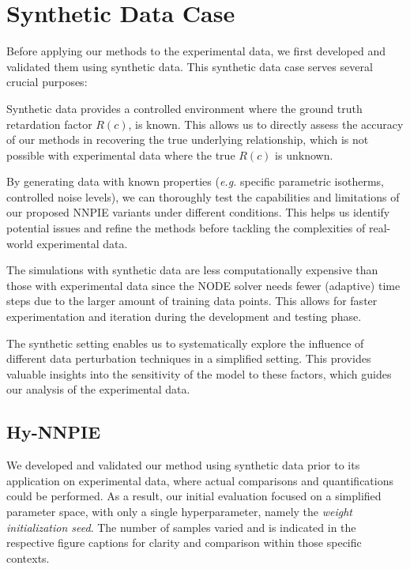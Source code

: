\section{Synthetic Data Case}
Before applying our methods to the experimental data, we first developed and validated them using synthetic data. This synthetic data case serves several crucial purposes:
\begin{enumerate*}
    \item Synthetic data provides a controlled environment where the ground truth retardation factor $R(c)$, is known. This allows us to directly assess the accuracy of our methods in recovering the true underlying relationship, which is not possible with experimental data where the true $R(c)$ is unknown.
    \item By generating data with known properties (\emph{e.g.} specific parametric isotherms, controlled noise levels), we can thoroughly test the capabilities and limitations of our proposed NNPIE variants under different conditions. This helps us identify potential issues and refine the methods before tackling the complexities of real-world experimental data.
    \item The simulations with synthetic data are less computationally expensive than those with experimental data since the NODE solver needs fewer (adaptive) time steps due to the larger amount of training data points. This allows for faster experimentation and iteration during the development and testing phase.
    \item The synthetic setting enables us to systematically explore the influence of different data perturbation techniques in a simplified setting. This provides valuable insights into the sensitivity of the model to these factors, which guides our analysis of the experimental data.
\end{enumerate*}

\subsection{Hy-NNPIE}
We developed and validated our method using synthetic data prior to its application on experimental data, where actual comparisons and quantifications could be performed. As a result, our initial evaluation focused on a simplified parameter space, with only a single hyperparameter, namely the \textit{weight initialization seed}.
The number of samples varied and is indicated in the respective figure captions for clarity and comparison within those specific contexts.

